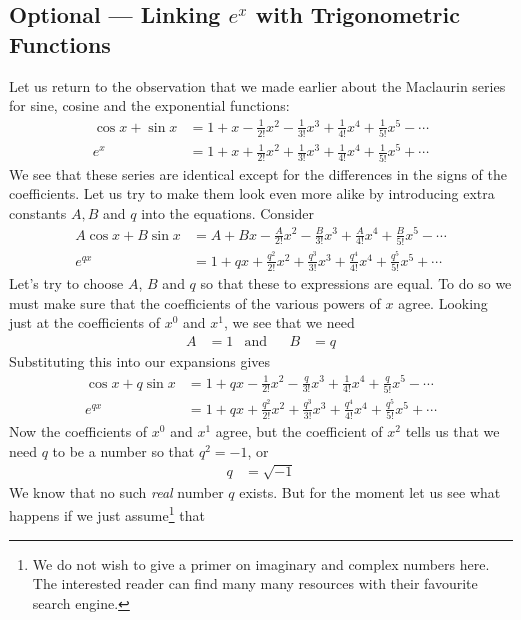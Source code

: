 \subsection{Optional --- Linking $e^x$ with Trigonometric Functions}
\label{sec:Euler}

Let us return to the observation that we made earlier about the Maclaurin series for sine, cosine and the exponential
functions:
\begin{align*}
  \cos x + \sin x
  &= 1 + x - \frac{1}{2!}x^2 - \frac{1}{3!}x^3 + \frac{1}{4!}x^4 + \frac{1}{5!}x^5 - \cdots\\
  e^x
  &= 1 + x + \frac{1}{2!}x^2 + \frac{1}{3!}x^3 + \frac{1}{4!}x^4 + \frac{1}{5!}x^5 + \cdots
\end{align*}
We see that these series are identical except for the differences in the
signs of the coefficients.
Let us try to make them look even more alike by introducing extra constants
$A, B$ and $q$ into the equations. Consider
\begin{align*}
  A \cos x + B \sin x
  &= A + Bx - \frac{A}{2!}x^2 - \frac{B}{3!}x^3 + \frac{A}{4!}x^4 + \frac{B}{5!}x^5 - \cdots\\
  e^{q x}
  &= 1 + qx + \frac{q^2}{2!}x^2 + \frac{q^3}{3!}x^3 + \frac{q^4}{4!}x^4 + \frac{q^5}{5!}x^5 + \cdots
\end{align*}
Let's try to choose $A$, $B$ and $q$ so that these to expressions are equal.
To do so we must make sure that the coefficients of the various powers of
$x$ agree. Looking just at the coefficients of $x^0$ and $x^1$, we see
that we need
\begin{align*}
  A&=1 & \text{and}&& B&=q
\end{align*}
Substituting this into our expansions gives
\begin{align*}
  \cos x + q\sin x
  &= 1 + qx - \frac{1}{2!}x^2 - \frac{q}{3!}x^3 + \frac{1}{4!}x^4 + \frac{q}{5!}x^5 - \cdots\\
  e^{q x}
  &= 1 + qx + \frac{q^2}{2!}x^2 + \frac{q^3}{3!}x^3 + \frac{q^4}{4!}x^4 + \frac{q^5}{5!}x^5 + \cdots
\end{align*}
Now the coefficients of $x^0$ and $x^1$ agree, but the coefficient of $x^2$ tells us that we need $q$ to be a number so
that $q^2 =-1$, or
\begin{align*}
  q &= \sqrt{-1}
\end{align*}
We know that no such \emph{real} number $q$ exists. But for the moment
let us see what happens if we just assume\footnote{We do not wish to give a primer on imaginary and complex numbers here. The interested reader can find
many many resources with their favourite search engine.} that
